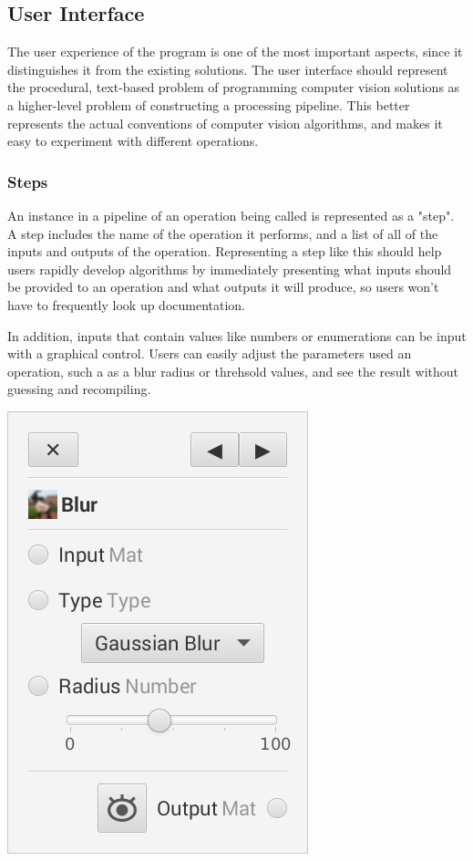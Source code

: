 \documentclass[12pt]{article}
\begin{document}
\subsection{User Interface}
The user experience of the program is one of the most important aspects, since
it distinguishes it from the existing solutions.  The user interface should
represent the procedural, text-based problem of programming computer vision
solutions as a higher-level problem of constructing a processing pipeline.
This better represents the actual conventions of computer vision algorithms,
and makes it easy to experiment with different operations.

\subsubsection{Steps}
An instance in a pipeline of an operation being called is represented as a
"step".  A step includes the name of the operation it performs, and a list of
all of the inputs and outputs of the operation.  Representing a step like this
should help users rapidly develop algorithms by immediately presenting what
inputs should be provided to an operation and what outputs it will produce, so
users won't have to frequently look up documentation.
\par
In addition, inputs that contain values like numbers or enumerations can be
input with a graphical control.  Users can easily adjust the parameters used
an operation, such a as a blur radius or threhsold values, and see the result
without guessing and recompiling.\\[0.5 cm]

\centerline{
    \includegraphics[scale = 0.5]{step.png}
}
\end{document}
